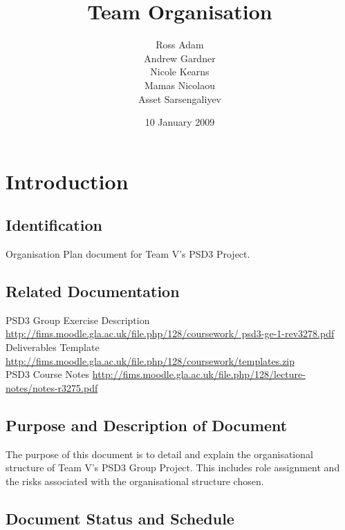 \documentclass{l3deliverable}
\title{Team Organisation}
\author{Ross Adam\\
     	Andrew Gardner\\
     	Nicole Kearns\\
 	Mamas Nicolaou\\
    	Asset Sarsengaliyev\\
}
\date{10 January 2009}
\begin{document}

\maketitle


\section{Introduction}

\subsection{Identification}

Organisation Plan document for Team V’s PSD3 Project.

\subsection{Related Documentation}

PSD3 Group Exercise Description \url{http://fims.moodle.gla.ac.uk/file.php/128/coursework/
psd3-ge-1-rev3278.pdf}\\
Deliverables Template \url{http://fims.moodle.gla.ac.uk/file.php/128/coursework/templates.zip}\\
PSD3 Course Notes \url{http://fims.moodle.gla.ac.uk/file.php/128/lecture-notes/notes-r3275.pdf}\\
 
\subsection{Purpose and Description of Document}

The purpose of this document is to detail and explain the organisational structure of Team V’s PSD3
Group Project. This includes role assignment and the risks associated with the organisational structure
chosen.

\subsection{Document Status and Schedule}
\end{document}
